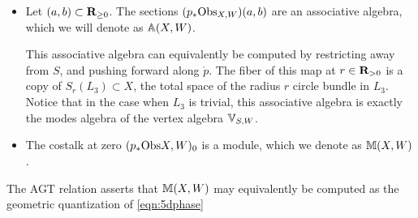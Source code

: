 \documentclass[11pt]{amsart}
\begin{document}
\begin{itemize}
\item Let $(a,b)\subset \R_{\geq 0}$. The sections $(p_* \Obs_{X, W})(a,b)$ are an associative algebra, which we will denote as $\AA(X, W)$. 

This associative algebra can equivalently be computed by restricting away from $S$, and pushing forward along $\mathring p$. The fiber of this map at $r \in \R_{>0}$ is a copy of $S_r(L_3)\subset X$, the total space of the radius $r$ circle bundle in $L_3$. Notice that in the case when $L_3$ is trivial, this associative algebra is exactly the modes algebra of the vertex algebra $\VV_{S,W}$. 

\item The costalk at zero $(p_*\Obs{X,W})_0$ is a module, which we denote as $\MM (X, W)$. 
\end{itemize}

The AGT relation asserts that $\MM(X,W)$ may equivalently be computed as the geometric quantization of \eqref{eqn:5dphase}
\end{document}
